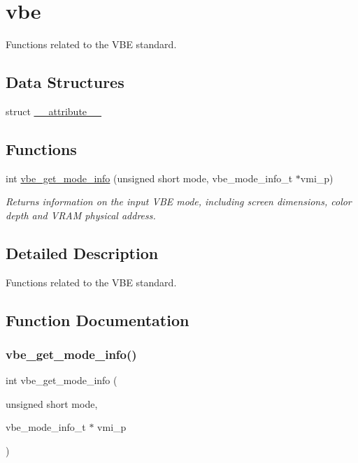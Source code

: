 \hypertarget{group__vbe}{}\section{vbe}
\label{group__vbe}


Functions related to the V\+BE standard.  


\subsection*{Data Structures}
\begin{DoxyCompactItemize}
\item 
struct \hyperlink{struct____attribute____}{\+\_\+\+\_\+attribute\+\_\+\+\_\+}
\end{DoxyCompactItemize}
\subsection*{Functions}
\begin{DoxyCompactItemize}
\item 
int \hyperlink{group__vbe_ga4ef3234e41f2050bc094a22049b69e45}{vbe\+\_\+get\+\_\+mode\+\_\+info} (unsigned short mode, vbe\+\_\+mode\+\_\+info\+\_\+t $\ast$vmi\+\_\+p)
\begin{DoxyCompactList}\small\item\em Returns information on the input V\+BE mode, including screen dimensions, color depth and V\+R\+AM physical address. \end{DoxyCompactList}\end{DoxyCompactItemize}


\subsection{Detailed Description}
Functions related to the V\+BE standard. 



\subsection{Function Documentation}
\hypertarget{group__vbe_ga4ef3234e41f2050bc094a22049b69e45}{}\label{group__vbe_ga4ef3234e41f2050bc094a22049b69e45} 
\subsubsection{\texorpdfstring{vbe\+\_\+get\+\_\+mode\+\_\+info()}{vbe\_get\_mode\_info()}}
{\footnotesize\ttfamily int vbe\+\_\+get\+\_\+mode\+\_\+info (\begin{DoxyParamCaption}\item[{unsigned short}]{mode,  }\item[{vbe\+\_\+mode\+\_\+info\+\_\+t $\ast$}]{vmi\+\_\+p }\end{DoxyParamCaption})}



